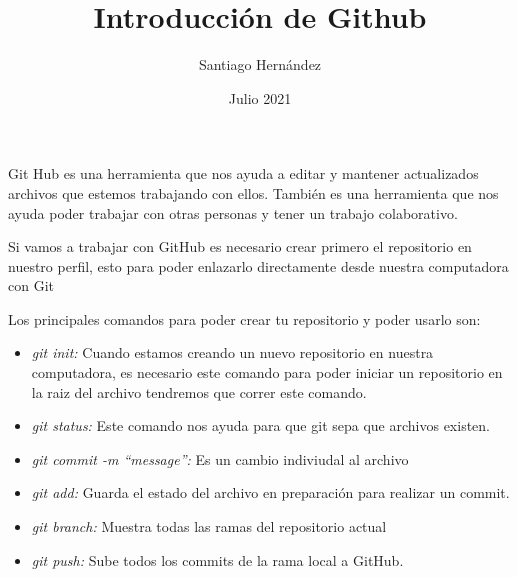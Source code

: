 \documentclass[a4paper,12pt]{article}
\title{\vspace{-3.5cm}Introducción de Github}
\author{\vspace{-6mm}Santiago Hernández}
\date{\vspace{-5mm}Julio 2021}
\begin{document}
  \maketitle
  Git Hub es una herramienta que nos ayuda a editar y mantener actualizados archivos que estemos trabajando con ellos. También es una herramienta que nos ayuda poder trabajar con otras personas y tener un trabajo colaborativo.

  Si vamos a trabajar con GitHub es necesario crear primero el repositorio en nuestro perfil, esto para poder enlazarlo directamente desde nuestra computadora con Git

  Los principales comandos para poder crear tu repositorio y poder usarlo son:

 \begin{itemize}
   \item \textit{git init:} Cuando estamos creando un nuevo repositorio en nuestra computadora, es necesario este comando para poder iniciar un repositorio en la raiz del archivo tendremos que correr este comando.
   \item \textit{git status:} Este comando nos ayuda para que git sepa que archivos existen.
   \item \textit{git commit -m ``message'':} Es un cambio indiviudal al archivo
   \item \textit{git add:} Guarda el estado del archivo en preparación para realizar un commit.
   \item \textit{git branch:} Muestra todas las ramas del repositorio actual
   \item \textit{git push:} Sube todos los commits de la rama local a GitHub.
 \end{itemize}
\end{document}
